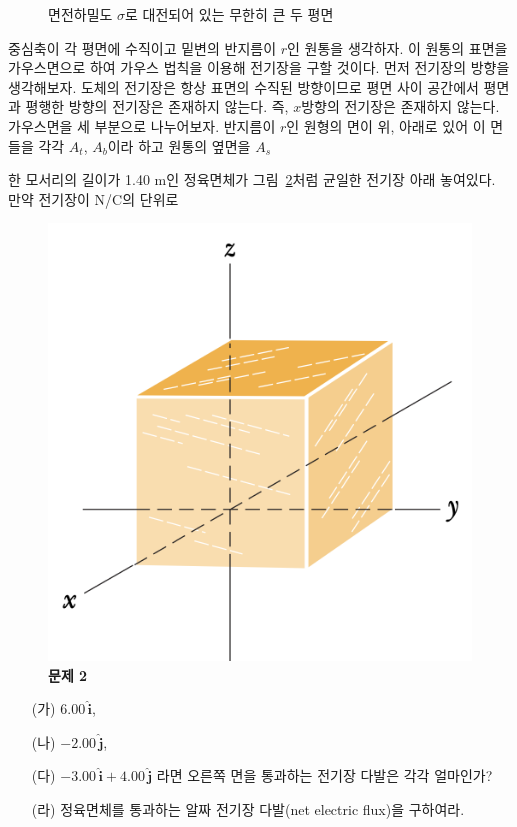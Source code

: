 \documentclass[tightenlines,floatfix,nofootinbib,superscriptaddress,fleqn]{revtex4-2}
\begin{document}
\begin{itemize}
\begin{figure}[htbp]
  \caption{면전하밀도 $\sigma$로 대전되어 있는 무한히 큰 두 평면}
  \label{fig:1-1}
\end{figure}
중심축이 각 평면에 수직이고 밑변의 반지름이 $r$인 원통을 생각하자. 이 원통의
표면을 가우스면으로 하여 가우스 법칙을 이용해 전기장을 구할 것이다. 먼저 전기장의 방향을
생각해보자. 도체의 전기장은 항상 표면의 수직된 방향이므로 평면 사이 공간에서 평면과 평행한
방향의 전기장은 존재하지 않는다. 즉, $x$방향의 전기장은 존재하지 않는다. 가우스면을 세 부분으로
나누어보자. 반지름이 $r$인 원형의 면이 위, 아래로 있어 이 면들을 각각 $A_{t}$, $A_{b}$이라
하고 원통의 옆면을 $A_s$
\end{itemize}


\vspace{0.5cm}
 한 모서리의 길이가 1.40 m인 정육면체가
그림~\ref{fig:1}처럼 균일한 전기장 아래 놓여있다. 만약 전기장이
N/C의 단위로 

\begin{figure}[htp]
  \centering
  \includegraphics[scale=0.6]{qfig3-1.png}
  \caption{\textbf{문제 2}}
  \label{fig:1}
\end{figure}
\begin{itemize}
\item[(가)] $6.00\,\hat{\bm{i}}$,
\item[(나)] $-2.00\,\hat{\bm{j}}$,
\item[(다)] $-3.00\,\hat{\bm{i}}+4.00\,\hat{\bm{j}}$  
  라면 오른쪽 면을 통과하는 전기장 다발은 각각 얼마인가?
\item[(라)] 정육면체를 통과하는 알짜 전기장 다발(net electric flux)을
  구하여라.   
\end{itemize}
\vspace{0.5cm}
\end{document}

